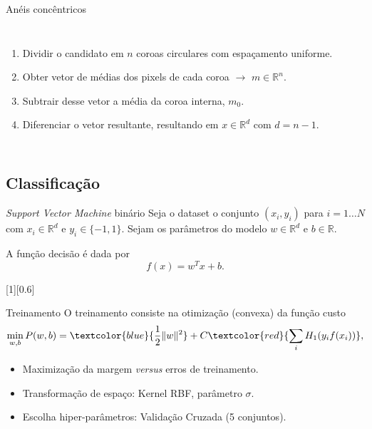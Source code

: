 	\begin{frame}{Anéis concêntricos}
		\begin{columns}
		\begin{enumerate}
			\item Dividir o candidato em $n$ coroas circulares com espaçamento uniforme.
			\item Obter vetor de médias dos pixels de cada coroa $\rightarrow$ $m \in \mathbb{R}^n$.
			\item Subtrair desse vetor a média da coroa interna, $m_0$.
			\item Diferenciar o vetor resultante, resultando em $x \in \mathbb{R}^d$  com $d=n-1$.
		\end{enumerate}
		\end{columns}
	\end{frame}

\subsection{Classificação}
	\begin{frame}{\textit{Support Vector Machine} binário}
		Seja o dataset o conjunto $(x_i, y_i)$ para $i=1 \dots N$ com $x_i \in \mathbb{R}^d$ e $y_i \in \{-1, 1\}$. Sejam os parâmetros do modelo $w \in \mathbb{R}^d$ e $b \in \mathbb{R}$.

		A função decisão é dada por
		\begin{equation*}
		f(x)=w^T x+ b.
		\end{equation*}

		[1][0.6]
	\end{frame}

	\begin{frame}{Treinamento}
		O treinamento consiste na otimização (convexa) da função custo
		\begin{equation*}
			\label{eq:svm-cost}
			\min_{w,b} P(w,b) = \textcolor{blue}{\frac{1}{2}\|w\|^2} + C\textcolor{red}{\sum_i H_1(y_i f(x_i))},
		\end{equation*}

		\begin{itemize}
			\item<1-> Maximização da margem \emph{versus} erros de treinamento.
			\item<2-> Transformação de espaço: Kernel RBF, parâmetro $\sigma$.
			\item<3-> Escolha hiper-parâmetros: Validação Cruzada (5 conjuntos).
		\end{itemize}

	\end{frame}
